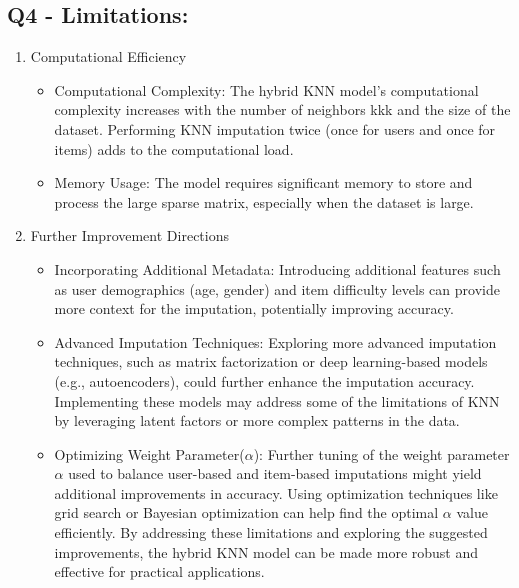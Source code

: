 \documentclass{article}
\begin{document}
\subsection*{Q4 - Limitations:}
\begin{enumerate}
    \item Computational Efficiency
    \begin{itemize}
        \item Computational Complexity:\newline
        The hybrid KNN model's computational complexity increases with the number of neighbors kkk and the size of the dataset. Performing KNN imputation twice (once for users and once for items) adds to the computational load.
        \item Memory Usage:\newline
        The model requires significant memory to store and process the large sparse matrix, especially when the dataset is large.
    \end{itemize}
    \item Further Improvement Directions
    \begin{itemize}
        \item Incorporating Additional Metadata:\newline
        Introducing additional features such as user demographics (age, gender) and item difficulty levels can provide more context for the imputation, potentially improving accuracy.
        \item Advanced Imputation Techniques:\newline
        Exploring more advanced imputation techniques, such as matrix factorization or deep learning-based models (e.g., autoencoders), could further enhance the imputation accuracy. Implementing these models may address some of the limitations of KNN by leveraging latent factors or more complex patterns in the data.
        \item Optimizing Weight Parameter($\alpha$):\newline
        Further tuning of the weight parameter $\alpha$ used to balance user-based and item-based imputations might yield additional improvements in accuracy. Using optimization techniques like grid search or Bayesian optimization can help find the optimal $\alpha$ value efficiently.
        By addressing these limitations and exploring the suggested improvements, the hybrid KNN model can be made more robust and effective for practical applications.
    \end{itemize}
\end{enumerate}
\newpage
\end{document}
